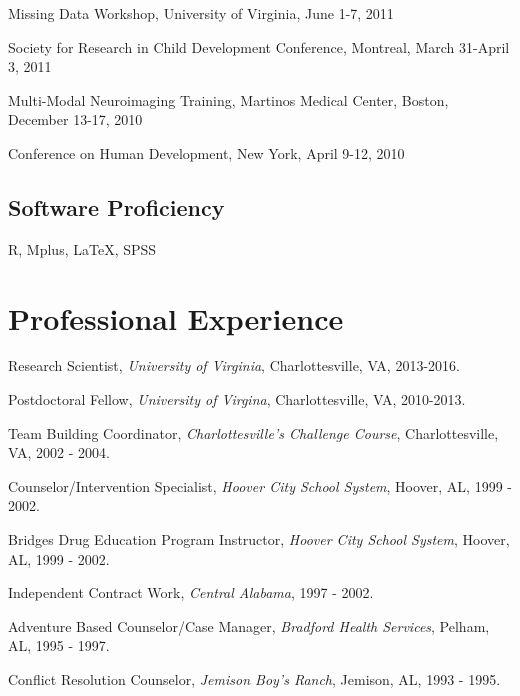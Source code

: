 \documentclass[11pt,]{article}
\begin{document}
Missing Data Workshop, University of Virginia, June 1-7, 2011

Society for Research in Child Development Conference, Montreal, March
31-April 3, 2011

Multi-Modal Neuroimaging Training, Martinos Medical Center, Boston,
December 13-17, 2010

Conference on Human Development, New York, April 9-12, 2010

\hypertarget{software-proficiency}{%
\subsection{Software Proficiency}\label{software-proficiency}}

R, Mplus, \LaTeX, SPSS

\hypertarget{professional-experience}{%
\section{Professional Experience}\label{professional-experience}}

Research Scientist, \emph{University of Virginia}, Charlottesville, VA,
2013-2016.

Postdoctoral Fellow, \emph{University of Virgina}, Charlottesville, VA,
2010-2013.

Team Building Coordinator, \emph{Charlottesville's Challenge Course},
Charlottesville, VA, 2002 - 2004.

Counselor/Intervention Specialist, \emph{Hoover City School System},
Hoover, AL, 1999 - 2002.

Bridges Drug Education Program Instructor, \emph{Hoover City School
System}, Hoover, AL, 1999 - 2002.

Independent Contract Work, \emph{Central Alabama}, 1997 - 2002.

Adventure Based Counselor/Case Manager, \emph{Bradford Health Services},
Pelham, AL, 1995 - 1997.

Conflict Resolution Counselor, \emph{Jemison Boy's Ranch}, Jemison, AL,
1993 - 1995.
\end{document}
